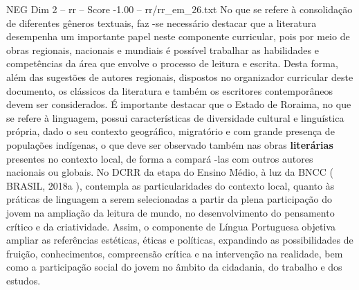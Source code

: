 \begin{textsample}{NEG Dim 2 – rr – Score -1.00 – rr/rr\_em\_26.txt}
No que se refere à consolidação de diferentes gêneros textuais, faz -se necessário destacar que a literatura desempenha um importante papel neste componente curricular, pois por meio de obras regionais, nacionais e mundiais é possível trabalhar as habilidades e competências da área que envolve o processo de leitura e escrita.
Desta forma, além das sugestões de autores regionais, dispostos no organizador curricular deste documento, os clássicos da literatura e também os escritores contemporâneos devem ser considerados.
É importante destacar que o Estado de Roraima, no que se refere à linguagem, possui características de diversidade cultural e linguística própria, dado o seu contexto geográfico, migratório e com grande presença de populações indígenas, o que deve ser observado também nas obras \textbf{literárias} presentes no contexto local, de forma a compará -las com outros autores nacionais ou globais.
No DCRR da etapa do Ensino Médio, à luz da BNCC ( BRASIL, 2018a ), contempla as particularidades do contexto local, quanto às práticas de linguagem a serem selecionadas a partir da plena participação do jovem na ampliação da leitura de mundo, no desenvolvimento do pensamento crítico e da criatividade.
Assim, o componente de Língua Portuguesa objetiva ampliar as referências estéticas, éticas e políticas, expandindo as possibilidades de fruição, conhecimentos, compreensão crítica e na intervenção na realidade, bem como a participação social do jovem no âmbito da cidadania, do trabalho e dos estudos.

\end{textsample}
